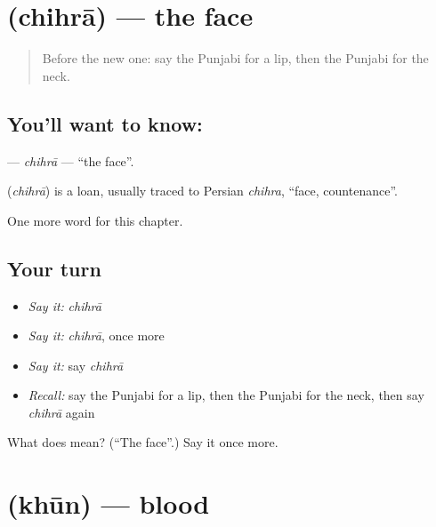 \section[\texorpdfstring{\pa{ਚਿਹਰਾ} (chihrā)}{ਚਿਹਰਾ (chihrā)}]{ (chihrā) — the face}

\label{lesson:PA-C50-chihra}



\begin{quote}
Before the new one: say the Punjabi for a lip, then the Punjabi for the neck.
\end{quote}

\subsection*{You'll want to know: }
\textbf{} — \emph{chihrā} — \textquotedblleft{}the face\textquotedblright{}.

\begin{cousinweb}
\textbf{} (\emph{chihrā}) is a loan, usually traced to Persian \emph{chihra}, \textquotedblleft{}face, countenance\textquotedblright{}.
\end{cousinweb}

\begin{grammarlens}[title={What you've built}]
One more word for this chapter.
\end{grammarlens}

\subsection*{Your turn}
\begin{itemize}
\raggedright
  \item \emph{Say it:} \emph{chihrā}
  \item \emph{Say it:} \emph{chihrā}, once more
  \item \emph{Say it:} say \emph{chihrā}
  \item \emph{Recall:} say the Punjabi for a lip, then the Punjabi for the neck, then say \emph{chihrā} again
\end{itemize}

\begin{tcolorbox}[breakable,colback=teal!4,colframe=teal!35!black,title={Before you move on}]
What does  mean? (\textquotedblleft{}The face\textquotedblright{}.) Say it once more.
\end{tcolorbox}
\section[\texorpdfstring{\pa{ਖ਼ੂਨ} (khūn)}{ਖ਼ੂਨ (khūn)}]{ (khūn) — blood}

